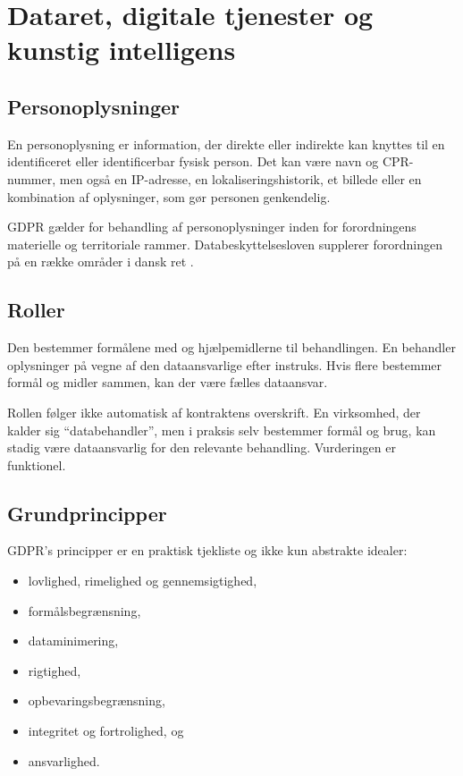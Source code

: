 \chapter{Dataret, digitale tjenester og kunstig intelligens}


\section{Personoplysninger}

En personoplysning er information, der direkte eller indirekte kan knyttes til en identificeret eller identificerbar fysisk person. Det kan være navn og CPR-nummer, men også en IP-adresse, en lokaliseringshistorik, et billede eller en kombination af oplysninger, som gør personen genkendelig.

GDPR gælder for behandling af personoplysninger inden for forordningens materielle og territoriale rammer. Databeskyttelsesloven supplerer forordningen på en række områder i dansk ret \citep{gdpr,databeskyttelsesloven}.

\section{Roller}

Den  bestemmer formålene med og hjælpemidlerne til behandlingen. En  behandler oplysninger på vegne af den dataansvarlige efter instruks. Hvis flere bestemmer formål og midler sammen, kan der være fælles dataansvar.

Rollen følger ikke automatisk af kontraktens overskrift. En virksomhed, der kalder sig ``databehandler'', men i praksis selv bestemmer formål og brug, kan stadig være dataansvarlig for den relevante behandling. Vurderingen er funktionel.

\section{Grundprincipper}

GDPR's principper er en praktisk tjekliste og ikke kun abstrakte idealer:
\begin{itemize}
  \item lovlighed, rimelighed og gennemsigtighed,
  \item formålsbegrænsning,
  \item dataminimering,
  \item rigtighed,
  \item opbevaringsbegrænsning,
  \item integritet og fortrolighed, og
  \item ansvarlighed.
\end{itemize}

